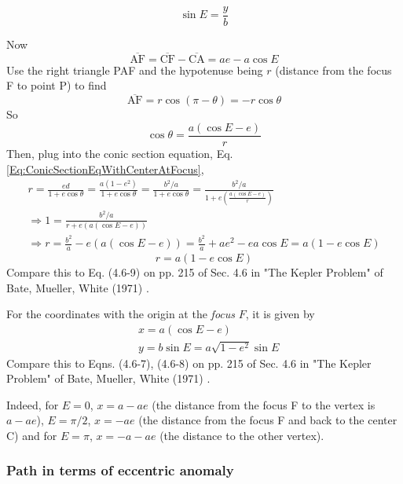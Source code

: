 \documentclass[10pt]{amsart}
\begin{document}
\begin{multicols*}{2}
\begin{equation}
\sin{E} = \frac{y}{b}
\end{equation}

Now
\[
\overline{\text{AF}} = \overline{\text{CF}} - \overline{\text{CA}} = ae - a\cos{E}
\]
Use the right triangle PAF and the hypotenuse being $r$ (distance from the focus F to point P) to find
\[
\overline{\text{AF}} = r\cos{(\pi - \theta)} = -r\cos{\theta}
\]
So
\[
\cos{\theta} = \frac{ a ( \cos{E} - e) }{r} 
\]
Then, plug into the conic section equation, Eq. \ref{Eq:ConicSectionEqWithCenterAtFocus}, 
\[
\begin{gathered}
	r = \frac{ed}{ 1 + e\cos{\theta}} = \frac{ a (1-e^2) }{ 1 + e\cos{\theta}} = \frac{b^2 /a}{ 1 + e\cos{\theta}} = \frac{b^2/a}{ 1 + e\left( \frac{ a(\cos{E} - e) }{ r} \right) } \\
		\Longrightarrow 1 = \frac{ b^2 / a}{ r + e(a(\cos{E} - e))} \\
		\Longrightarrow r = \frac{b^2}{a} - e(a(\cos{E} - e)) = \frac{b^2}{a} + ae^2 - ea \cos{E} = a(1 - e \cos{E})
\end{gathered}
\]
\begin{equation}\label{Eq:EllipseEquationWithEccentricAnomaly}
\boxed{ r = a(1 - e\cos{E}) }
\end{equation}
Compare this to Eq. (4.6-9) on pp. 215 of Sec. 4.6 in "The Kepler Problem" of Bate, Mueller, White (1971) \cite{BMW1971}.

For the coordinates with the origin at the \emph{focus} $F$, it is given by 
\begin{equation}\label{Eq:EllipticalPathInEccentricAnomaly}
\begin{aligned}
& x = a(\cos{E} - e) \\
& y = b\sin{E} = a\sqrt{ 1 - e^2} \sin{E}
\end{aligned}
\end{equation}
Compare this to Eqns. (4.6-7), (4.6-8) on pp. 215 of Sec. 4.6 in "The Kepler Problem" of Bate, Mueller, White (1971) \cite{BMW1971}.

Indeed, for $E=0$, $x = a - ae$ (the distance from the focus F to the vertex is $a - ae$), $E = \pi/2$, $x =-ae$ (the distance from the focus F and back to the center C) and for $E = \pi$, $x = -a - ae$ (the distance to the other vertex).

\subsubsection{Path in terms of eccentric anomaly}


\end{multicols*}
\end{document}
